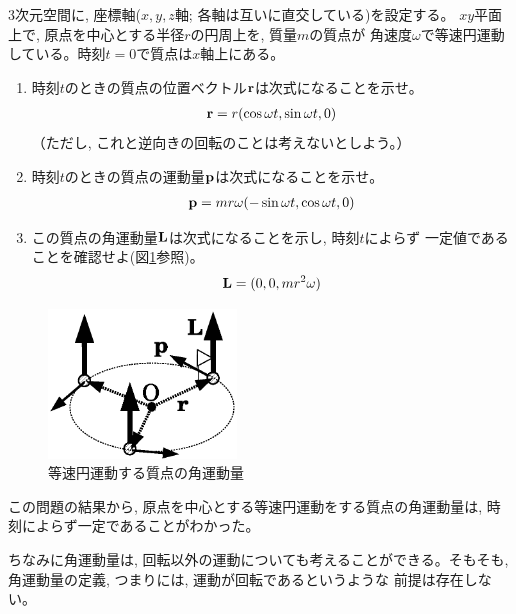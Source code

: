 %
\begin{q}\label{q:circle_angularmom}
3次元空間に, 座標軸($x,y,z$軸; 各軸は互いに直交している)を設定する。
$xy$平面上で, 原点を中心とする半径$r$の円周上を, 質量$m$の質点が
角速度$\omega$で等速円運動している。時刻$t=0$で質点は$x$軸上にある。
\begin{enumerate}
\item 時刻$t$のときの質点の位置ベクトル${\bf r}$は次式になることを示せ。
\begin{eqnarray}
{\bf r}=r(\cos \omega t, \sin \omega t, 0)\label{eq:circle_angularmom1}
\end{eqnarray}
（ただし, これと逆向きの回転のことは考えないとしよう。）
\item 時刻$t$のときの質点の運動量${\bf p}$は次式になることを示せ。
\begin{eqnarray}
{\bf p}=mr\omega(-\sin \omega t, \cos \omega t, 0)\label{eq:circle_angularmom2}
\end{eqnarray}
\item この質点の角運動量${\bf L}$は次式になることを示し, 時刻$t$によらず
一定値であることを確認せよ(図\ref{fig:angular_mom_circ}参照)。
\begin{eqnarray}
{\bf L}=(0, 0, mr^2\omega)\label{eq:circle_angularmom3}
\end{eqnarray}
\end{enumerate}
\begin{figure}[h]
    \centering
    \includegraphics[width=5cm]{angular_mom_circ.eps}
    \caption{等速円運動する質点の角運動量}\label{fig:angular_mom_circ}
\end{figure}\end{q}

この問題の結果から, 原点を中心とする等速円運動をする質点の角運動量は, 
時刻によらず一定であることがわかった。

ちなみに角運動量は, 回転以外の運動についても考えることができる。そもそも, 
角運動量の定義, つまりには, 運動が回転であるというような
前提は存在しない。\mv

